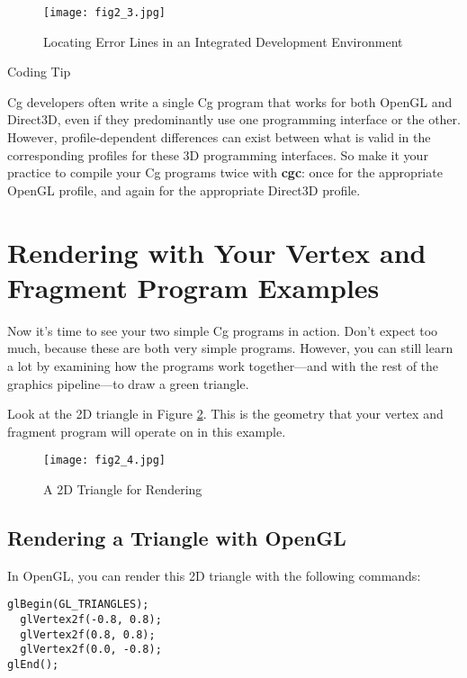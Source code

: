 \documentclass[../main.tex]{subfiles}
\begin{document}
\begin{figure}
    \centering
    \texttt{[image: fig2\_3.jpg]}
    \caption{Locating Error Lines in an Integrated Development Environment}
    \label{fig:2-3}
\end{figure}

\begin{framed}
Coding Tip

Cg developers often write a single Cg program that works for both OpenGL and Direct3D, even if they predominantly use one programming interface or the other. However, profile-dependent differences can exist between what is valid in the corresponding profiles for these 3D programming interfaces. So make it your practice to compile your Cg programs twice with \textbf{cgc}: once for the appropriate OpenGL profile, and again for the appropriate Direct3D profile.
\end{framed}

\section{Rendering with Your Vertex and Fragment Program Examples}

Now it's time to see your two simple Cg programs in action. Don't expect too much, because these are both very simple programs. However, you can still learn a lot by examining how the programs work together—and with the rest of the graphics pipeline—to draw a green triangle.

Look at the 2D triangle in Figure \ref{fig:2-4}. This is the geometry that your vertex and fragment program will operate on in this example.

\begin{figure}
    \centering
    \texttt{[image: fig2\_4.jpg]}
    \caption{A 2D Triangle for Rendering}
    \label{fig:2-4}
\end{figure}

\subsection{Rendering a Triangle with OpenGL}

In OpenGL, you can render this 2D triangle with the following commands:

\FloatBarrier
\begin{lstlisting}
glBegin(GL_TRIANGLES);
  glVertex2f(-0.8, 0.8);
  glVertex2f(0.8, 0.8);
  glVertex2f(0.0, -0.8);
glEnd();
\end{lstlisting}
\FloatBarrier
\end{document}
